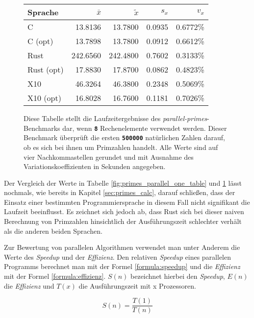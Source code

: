 \begin{figure}[hb]
	\begin{center}
		\begin{tabular}{lrrrr}
			\toprule
			Sprache & $\bar{x}$ & $\tilde{x}$ & $s_x$ & $v_x$ \\
			\midrule
			C          &  13.8136 &  13.7800 & 0.0935 & 0.6772\% \\
			C (opt)    &  13.7898 &  13.7800 & 0.0912 & 0.6612\% \\
			Rust       & 242.6560 & 242.4800 & 0.7602 & 0.3133\% \\
			Rust (opt) &  17.8830 &  17.8700 & 0.0862 & 0.4823\% \\
			X10        &  46.3264 &  46.3800 & 0.2348 & 0.5069\% \\
			X10 (opt)  &  16.8028 &  16.7600 & 0.1181 & 0.7026\% \\
			\bottomrule
		\end{tabular}
	\end{center}
	\caption{
		Diese Tabelle stellt die Laufzeitergebnisse des \textit{parallel-primes}-Benchmarks dar,
		wenn \texttt{\textsc{\textbf{8}}} Rechenelemente verwendet werden.
		Dieser Benchmark überprüft die ersten \texttt{\textsc{\textbf{500000}}} natürlichen Zahlen darauf,
		ob es sich bei ihnen um Primzahlen handelt.
		Alle Werte sind auf vier Nachkommastellen gerundet und mit Ausnahme des Variationskoeffizienten
		in Sekunden angegeben.
	}
	\label{fig:primes_parallel_eight_table}
\end{figure}

Der Vergleich der Werte in Tabelle \ref{fig:primes_parallel_one_table} und \ref{fig:primes_parallel_eight_table} 
lässt nochmals, wie bereits in Kapitel \ref{sec:primes_calc}, darauf schließen, dass der Einsatz einer bestimmten
Programmiersprache in diesem Fall nicht signifikant die Laufzeit beeinflusst. Es zeichnet sich jedoch ab, dass
Rust sich bei dieser naiven Berechnung von Primzahlen hinsichtlich der Ausführungszeit schlechter verhält als
die anderen beiden Sprachen.

Zur Bewertung von parallelen Algorithmen verwendet man unter Anderem die Werte des \textit{Speedup}
und der \textit{Effizienz}.
Den relativen \textit{Speedup} eines parallelen Programms berechnet man mit der Formel \ref{formula:speedup} und die
\textit{Effizienz} mit der Formel \ref{formula:effizienz}. $S(n)$ bezeichnet hierbei den \textit{Speedup},
$E(n)$ die \textit{Effizienz} und $T(x)$ die Ausführungszeit mit x Prozessoren.

\begin{equation}
	\label{formula:speedup}
	S(n) = \frac{T(1)}{T(n)}
\end{equation}


